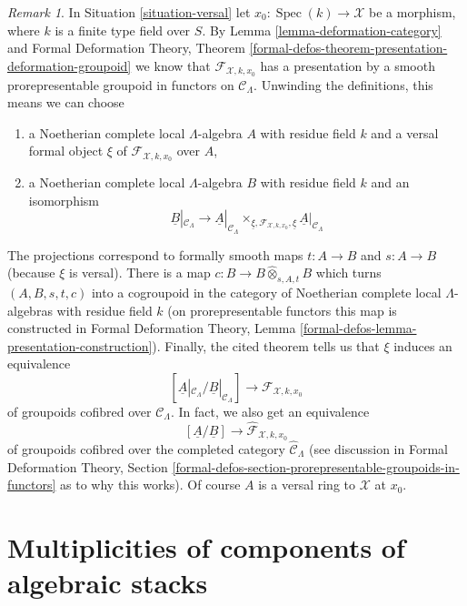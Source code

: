 \documentclass{stacks-project}
\theoremstyle{plain}
\theoremstyle{definition}
\theoremstyle{remark}
\newtheorem{remark}[subsection]{Remark}
\numberwithin{equation}{subsection}
\def\Spec{\mathop{\mathrm{Spec}}}
\begin{document}
\begin{remark}
\label{remark-groupoid-defo}
In Situation \ref{situation-versal} let $x_0 : \Spec(k) \to \mathcal{X}$
be a morphism, where $k$ is a finite type field over $S$.
By Lemma \ref{lemma-deformation-category} and
Formal Deformation Theory, Theorem
\ref{formal-defos-theorem-presentation-deformation-groupoid}
we know that $\mathcal{F}_{\mathcal{X}, k, x_0}$ has a
presentation by a smooth prorepresentable groupoid in
functors on $\mathcal{C}_\Lambda$.
Unwinding the definitions, this means we can choose
\begin{enumerate}
\item a Noetherian complete local $\Lambda$-algebra $A$
with residue field $k$ and a versal formal object $\xi$
of $\mathcal{F}_{\mathcal{X}, k, x_0}$ over $A$,
\item a Noetherian complete local $\Lambda$-algebra $B$
with residue field $k$ and an isomorphism
$$
\underline{B}|_{\mathcal{C}_\Lambda}
\longrightarrow
\underline{A}|_{\mathcal{C}_\Lambda}
\times_{\underline{\xi}, \mathcal{F}_{\mathcal{X}, k, x_0}, \underline{\xi}}
\underline{A}|_{\mathcal{C}_\Lambda}
$$
\end{enumerate}
The projections correspond to formally smooth maps
$t : A \to B$ and $s : A \to B$ (because $\xi$ is versal).
There is a map $c : B \to B \widehat{\otimes}_{s, A, t} B$
which turns $(A, B, s, t, c)$ into a cogroupoid in the category
of Noetherian complete local $\Lambda$-algebras with residue field $k$
(on prorepresentable functors this map is constructed in
Formal Deformation Theory, Lemma
\ref{formal-defos-lemma-presentation-construction}).
Finally, the cited theorem tells us that $\xi$ induces
an equivalence
$$
[\underline{A}|_{\mathcal{C}_\Lambda} / \underline{B}|_{\mathcal{C}_\Lambda}]
\longrightarrow
\mathcal{F}_{\mathcal{X}, k, x_0}
$$
of groupoids cofibred over $\mathcal{C}_\Lambda$. In fact, we also
get an equivalence
$$
[\underline{A}/\underline{B}]
\longrightarrow
\widehat{\mathcal{F}}_{\mathcal{X}, k, x_0}
$$
of groupoids cofibred over the completed category
$\widehat{\mathcal{C}}_\Lambda$ (see discussion in
Formal Deformation Theory, Section
\ref{formal-defos-section-prorepresentable-groupoids-in-functors}
as to why this works). Of course $A$ is a versal ring to
$\mathcal{X}$ at $x_0$.
\end{remark}








\section{Multiplicities of components of algebraic stacks}
\label{section-multiplicities}
\end{document}
